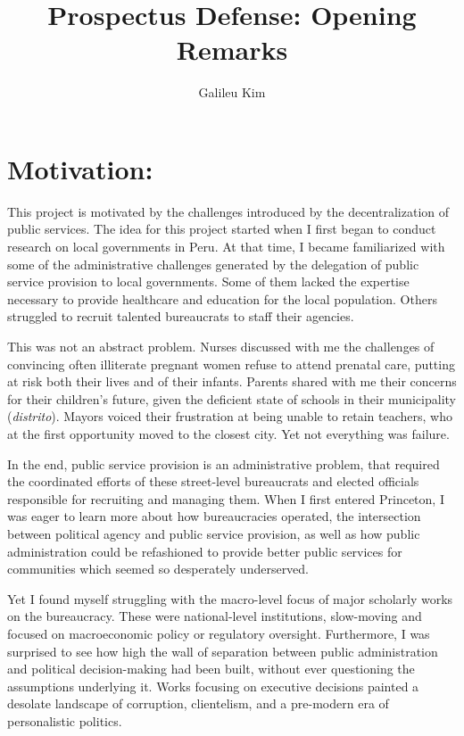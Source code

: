 \documentclass[12pt,a4paper]{article}
\author{Galileu Kim}
\title{Prospectus Defense: Opening Remarks}
\begin{document}
\maketitle
\section{Motivation:}
This project is motivated by the challenges introduced by the decentralization of public services. The idea for this project started when I first began to conduct research on local governments in Peru. At that time, I became familiarized with some of the administrative challenges generated by the delegation of public service provision to local governments. Some of them lacked the expertise necessary to provide healthcare and education for the local population. Others struggled to recruit talented bureaucrats to staff their agencies.

This was not an abstract problem. Nurses discussed with me the challenges of convincing often illiterate pregnant women refuse to attend prenatal care, putting at risk both their lives and of their infants. Parents shared with me their concerns for their children's future, given the deficient state of schools in their municipality (\textit{distrito}). Mayors voiced their frustration at being unable to retain teachers, who at the first opportunity moved to the closest city. Yet not everything was failure.

In the end, public service provision is an administrative problem, that required the coordinated efforts of these street-level bureaucrats and elected officials responsible for recruiting and managing them. When I first entered Princeton, I was eager to learn more about how bureaucracies operated, the intersection between political agency and public service provision, as well as how public administration could be refashioned to provide better public services for communities which seemed so desperately underserved.

Yet I found myself struggling with the macro-level focus of major scholarly works on the bureaucracy. These were national-level institutions, slow-moving and focused on macroeconomic policy or regulatory oversight. Furthermore, I was surprised to see how high the wall of separation between public administration and political decision-making had been built, without ever questioning the assumptions underlying it. Works focusing on executive decisions painted a desolate landscape of corruption, clientelism, and a pre-modern era of personalistic politics.
\end{document}
